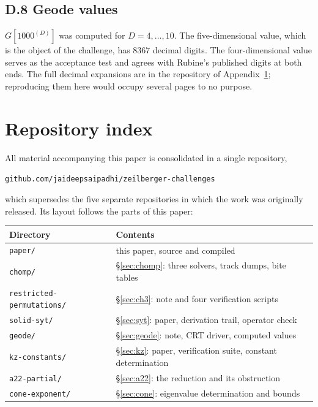 \documentclass[11pt]{article}
\theoremstyle{definition}
\begin{document}
\subsection*{D.8 Geode values}

$G[1000^{(D)}]$ was computed for $D=4,\dots,10$. The five-dimensional value,
which is the object of the challenge, has $8367$ decimal digits. The
four-dimensional value serves as the acceptance test and agrees with Rubine's
published digits at both ends. The full decimal expansions are in the
repository of Appendix~\ref{app:repo}; reproducing them here would occupy
several pages to no purpose.

\section{Repository index}\label{app:repo}

All material accompanying this paper is consolidated in a single repository,
\begin{center}
\texttt{github.com/jaideepsaipadhi/zeilberger-challenges}
\end{center}
which supersedes the five separate repositories in which the work was
originally released. Its layout follows the parts of this paper:

\begin{center}
\begin{tabular}{ll}
\toprule
Directory & Contents\\
\midrule
\texttt{paper/} & this paper, source and compiled\\
\texttt{chomp/} & \S\ref{sec:chomp}: three solvers, track dumps, bite tables\\
\texttt{restricted-permutations/} & \S\ref{sec:ch3}: note and four verification scripts\\
\texttt{solid-syt/} & \S\ref{sec:syt}: paper, derivation trail, operator check\\
\texttt{geode/} & \S\ref{sec:geode}: note, CRT driver, computed values\\
\texttt{kz-constants/} & \S\ref{sec:kz}: paper, verification suite, constant determination\\
\texttt{a22-partial/} & \S\ref{sec:a22}: the reduction and its obstruction\\
\texttt{cone-exponent/} & \S\ref{sec:cone}: eigenvalue determination and bounds\\
\bottomrule
\end{tabular}
\end{center}
\end{document}
